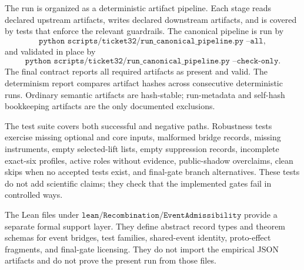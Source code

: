 \documentclass[11pt]{article}
\theoremstyle{definition}
\begin{document}
The run is organized as a deterministic artifact pipeline. Each stage reads declared upstream artifacts, writes declared downstream artifacts, and is covered by tests that enforce the relevant guardrails. The canonical pipeline is run by
\[
  \texttt{python scripts/ticket32/run\_canonical\_pipeline.py --all},
\]
and validated in place by
\[
  \texttt{python scripts/ticket32/run\_canonical\_pipeline.py --check-only}.
\]
The final contract reports all required artifacts as present and valid. The determinism report compares artifact hashes across consecutive deterministic runs. Ordinary semantic artifacts are hash-stable; run-metadata and self-hash bookkeeping artifacts are the only documented exclusions.

The test suite covers both successful and negative paths. Robustness tests exercise missing optional and core inputs, malformed bridge records, missing instruments, empty selected-lift lists, empty suppression records, incomplete exact-six profiles, active roles without evidence, public-shadow overclaims, clean skips when no accepted tests exist, and final-gate branch alternatives. These tests do not add scientific claims; they check that the implemented gates fail in controlled ways.

The Lean files under \(\texttt{lean/Recombination/EventAdmissibility}\) provide a separate formal support layer. They define abstract record types and theorem schemas for event bridges, test families, shared-event identity, proto-effect fragments, and final-gate licensing. They do not import the empirical JSON artifacts and do not prove the present run from those files.
\end{document}
